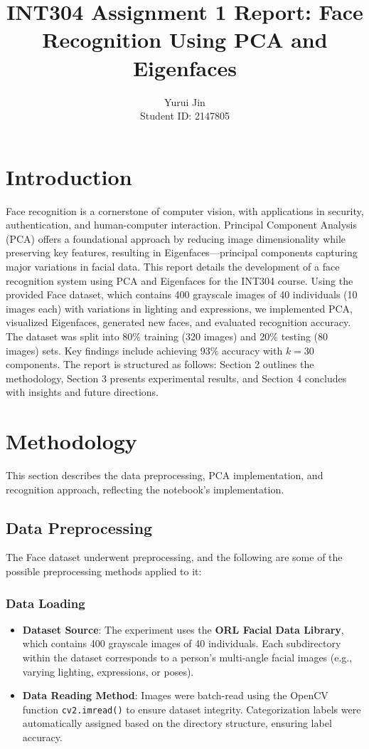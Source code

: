 \documentclass{article}
\title{INT304 Assignment 1 Report: Face Recognition Using PCA and Eigenfaces}
\author{Yurui Jin \\ Student ID: 2147805}
\begin{document}
	
	\maketitle
	\section{Introduction}
	Face recognition is a cornerstone of computer vision, with applications in security, authentication, and human-computer interaction. Principal Component Analysis (PCA) offers a foundational approach by reducing image dimensionality while preserving key features, resulting in Eigenfaces—principal components capturing major variations in facial data. This report details the development of a face recognition system using PCA and Eigenfaces for the INT304 course. Using the provided Face dataset, which contains 400 grayscale images of 40 individuals (10 images each) with variations in lighting and expressions, we implemented PCA, visualized Eigenfaces, generated new faces, and evaluated recognition accuracy. The dataset was split into 80\% training (320 images) and 20\% testing (80 images) sets. Key findings include achieving 93\% accuracy with \( k = 30 \) components. The report is structured as follows: Section 2 outlines the methodology, Section 3 presents experimental results, and Section 4 concludes with insights and future directions.
	
	\section{Methodology}
	This section describes the data preprocessing, PCA implementation, and recognition approach, reflecting the notebook’s implementation.
	
	\subsection{Data Preprocessing}
	The Face dataset underwent preprocessing, and the following are some of the possible preprocessing methods applied to it:
	
	\subsubsection{Data Loading}
	\begin{itemize}
		\item \textbf{Dataset Source}: The experiment uses the \textbf{ORL Facial Data Library}, which contains 400 grayscale images of 40 individuals. Each subdirectory within the dataset corresponds to a person's multi-angle facial images (e.g., varying lighting, expressions, or poses).
		\item \textbf{Data Reading Method}: Images were batch-read using the OpenCV function \texttt{cv2.imread()} to ensure dataset integrity. Categorization labels were automatically assigned based on the directory structure, ensuring label accuracy.
	\end{itemize}
	
\end{document}
